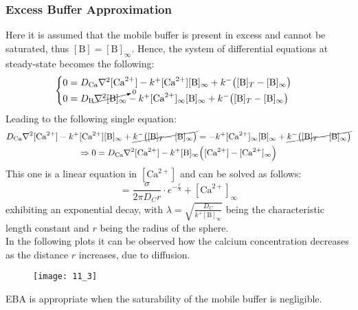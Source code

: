 \subsubsection{Excess Buffer Approximation}
Here it is assumed that the mobile buffer is present in excess and cannot be saturated, thus
\([\text{B}]=[\text{B}]_{\infty}\).
Hence, the system of differential equations at steady-state becomes the following:
\begin{equation*}
    \begin{cases}
        0=D_{\text{Ca}}\nabla^{2}[\text{Ca}^{2+}]-k^{+}[\text{Ca}^{2+}][\text{B}]_{\infty}+k^{-}\bigl([\text{B}]_{T}-[\text{B}]_{\infty}\bigr) \\
        0=D_{\text{B}}\cancelto{0}{\nabla^{2}[\text{B}]_{\infty}}-k^{+}[\text{Ca}^{2+}]_{\infty}[\text{B}]_{\infty}+k^{-}\bigl([\text{B}]_{T}-[\text{B}]_{\infty}\bigr)
    \end{cases}
\end{equation*}
Leading to the following single equation:
\begin{gather*}
    D_{\text{Ca}}\nabla^{2}[\text{Ca}^{2+}]-k^{+}[\text{Ca}^{2+}][\text{B}]_{\infty}+\cancel{k^{-}\bigl([\text{B}]_{T}-[\text{B}]_{\infty}\bigr)}
    =-k^{+}[\text{Ca}^{2+}]_{\infty}[\text{B}]_{\infty}+\cancel{k^{-}\bigl([\text{B}]_{T}-[\text{B}]_{\infty}\bigr)}\\
    \Rightarrow
    0=D_{\text{Ca}}\nabla^{2}[\text{Ca}^{2+}]-k^{+}[\text{B}]_{\infty}\Bigl([\text{Ca}^{2+}]-[\text{Ca}^{2+}]_{\infty}\Bigr)
\end{gather*}
This one is a linear equation in \([\text{Ca}^{2+}]\) and can be solved as follows:
\begin{equation*}
    [\text{Ca}^{2+}]=\frac{\sigma}{2\pi{D_{C}r}}\cdot{e^{-\frac{r}{\lambda}}}+[\text{Ca}^{2+}]_{\infty}
\end{equation*}
exhibiting an exponential decay, with \(\lambda=\sqrt{\frac{D_{C}}{k^{+}[\text{B}]_{\infty}}}\) being
the characteristic length constant and \(r\) being the radius of the sphere.\\
In the following plots it can be observed how the calcium concentration decreases as the distance
\(r\) increases, due to diffusion.
\begin{figure}[H]
    \texttt{[image: 11\_3]}
    \centering
\end{figure}
EBA is appropriate when the saturability of the mobile buffer is negligible.
